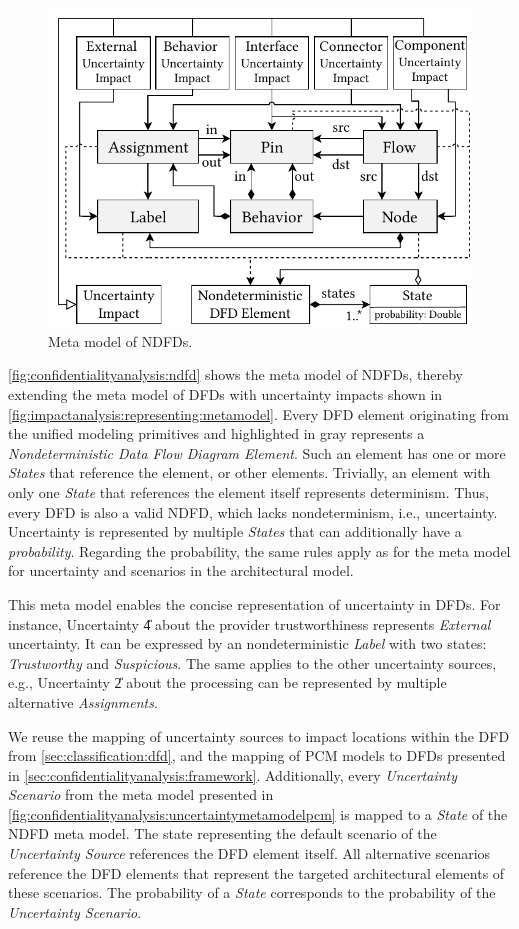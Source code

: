 \begin{figure}
    \centering
    \includegraphics[width=0.8\linewidth]{figures/chapter7/ndfd.pdf}
    \caption{Meta model of \acfp*{NDFD}.}
    \label{fig:confidentialityanalysis:ndfd}
\end{figure}

\autoref{fig:confidentialityanalysis:ndfd} shows the meta model of \acp{NDFD}, thereby extending the meta model of \acp{DFD} with uncertainty impacts shown in \autoref{fig:impactanalysis:representing:metamodel}.
Every \ac{DFD} element originating from the unified modeling primitives \cite{seifermann_unified_2021} and highlighted in gray represents a \emph{Nondeterministic Data Flow Diagram Element}.
Such an element has one or more \emph{States} that reference the element, or other elements.
Trivially, an element with only one \emph{State} that references the element itself represents determinism.
Thus, every \ac{DFD} is also a valid \ac{NDFD}, which lacks nondeterminism, i.e., uncertainty.
Uncertainty is represented by multiple \emph{States} that can additionally have a \emph{probability}.
Regarding the probability, the same rules apply as for the meta model for uncertainty and scenarios in the architectural model.

This meta model enables the concise representation of uncertainty in \acp{DFD}.
For instance, Uncertainty \U{4} about the provider trustworthiness represents \emph{External} uncertainty.
It can be expressed by an nondeterministic \emph{Label} with two states: \emph{Trustworthy} and \emph{Suspicious}.
The same applies to the other uncertainty sources, e.g., Uncertainty \U{2} about the processing can be represented by multiple alternative \emph{Assignments}.

We reuse the mapping of uncertainty sources to impact locations within the \ac{DFD} from \autoref{sec:classification:dfd}, and the mapping of \ac{PCM} models to \acp{DFD} presented in \autoref{sec:confidentialityanalysis:framework}.
Additionally, every \emph{Uncertainty Scenario} from the meta model presented in \autoref{fig:confidentialityanalysis:uncertaintymetamodelpcm} is mapped to a \emph{State} of the \ac{NDFD} meta model.
The state representing the default scenario of the \emph{Uncertainty Source} references the \ac{DFD} element itself.
All alternative scenarios reference the \ac{DFD} elements that represent the targeted architectural elements of these scenarios.
The probability of a \emph{State} corresponds to the probability of the \emph{Uncertainty Scenario}.

